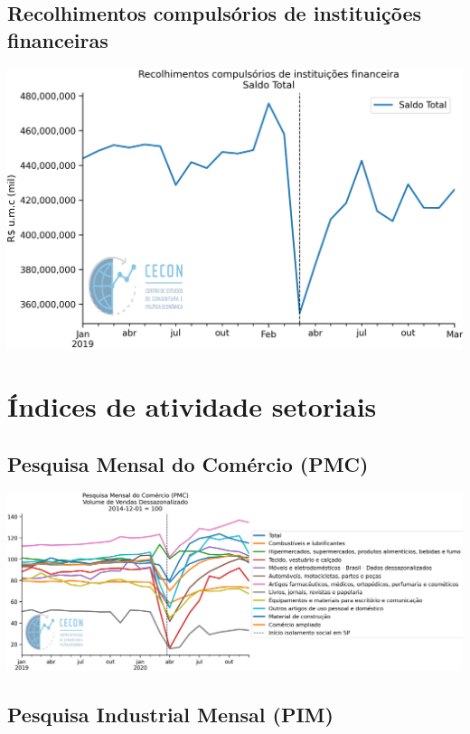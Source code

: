 \documentclass{SelfArx}
\begin{document}
\subsection*{Recolhimentos compulsórios de instituições financeiras}
\label{sec:org3a99238}

\begin{center}
\includegraphics[width=.9\linewidth]{./figs/Credito/Recolhimentos_Total.png}
\end{center}

\section*{Índices de atividade setoriais}
\label{sec:org496ba9d}


\subsection*{Pesquisa Mensal do Comércio (PMC)}
\label{sec:org6cbde9b}

\begin{center}
\includegraphics[width=.9\linewidth]{./figs/Setoriais/PMC_IBGE.png}
\end{center}


\subsection*{Pesquisa Industrial Mensal (PIM)}
\label{sec:orga5befe4}
\end{document}
